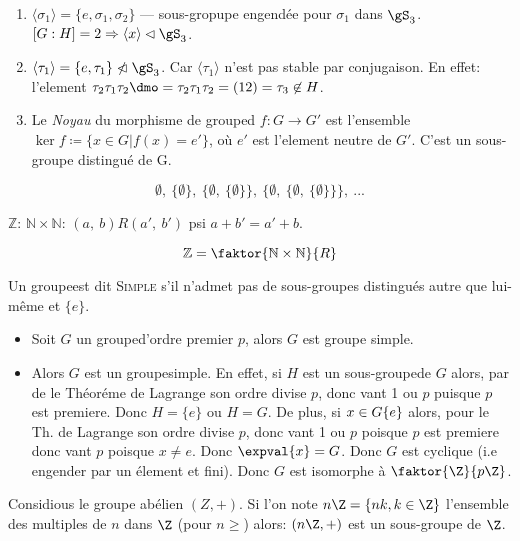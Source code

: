\begin{examplebox}
	\begin{enumerate}
		\item $\langle \sigma_1 \rangle=\{e,\sigma_1,\sigma_2\}$ --- sous-gropupe engendée pour $\sigma_1$ dans $\gS_3$. $[G:H]=2\Rightarrow \langle x\rangle\lhd\gS_3$.
		\item $\langle \tau_1\rangle=\{e,\tau_1\}\ntriangleleft\gS_3$. Car $\langle \tau_1 \rangle$ n'est pas stable par conjugaison. En effet: l'element $\tau_2\tau_1\tau_2\dmo =\tau_2\tau_1\tau_2=(12)=\tau_3\not\in H$.
		\item Le \emph{Noyau} du morphisme de grouped $f:G\rightarrow G'$ est l'ensemble $\ker f\coloneq\{x\in G | f(x)=e'\}$, où $e'$ est l'element neutre de $G'$. C'est un sous-groupe distingué de G.
	\end{enumerate}
\end{examplebox}

\ifcomment
$$\emptyset,\ \{\emptyset\},\ \{\emptyset,\ \{\emptyset\}\},\ \{\emptyset,\ \{\emptyset,\ \{\emptyset\}\}\},\ ...$$

$\mathbb{Z}$: $\mathbb{N}\times\mathbb{N}$:
$(a,\ b)R(a',\ b')$ psi $a+b'=a' + b$.

$$\mathbb{Z}=\faktor{\mathbb{N}\times\mathbb{N}}{R}$$
\fi


\begin{definition}
	Un groupeest dit \textsc{Simple} s'il n'admet pas de sous-groupes distingués autre que lui-même et $\{e\}$.
\end{definition}

\begin{examplebox}
	\begin{itemize}
		\item Soit $G$ un grouped'ordre premier $p$, alors $G$ est groupe simple.
		\item Alors $G$ est un groupesimple. En effet, si $H$ est un sous-groupede $G$ alors, par de le Théoréme de Lagrange son ordre divise $p$, donc vant 1 ou $p$ puisque $p$ est premiere. Donc $H=\{e\}$ ou $H=G$. De plus, si $x\in G\\ \{e\}$ alors, pour le Th. de Lagrange son ordre divise $p$, donc vant 1 ou $p$ poisque $p$ est premiere donc vant $p$ poisque $x\neq e$. Donc $\expval{x}=G$. Donc $G$ est cyclique (i.e engender par un élement et fini). Donc $G$ est isomorphe à $\faktor{\Z}{p\Z}$.
	\end{itemize}
\end{examplebox}

Considious le groupe abélien $(Z, +)$. Si l'on note $n\Z=\{nk, k\in\Z\}$ l'ensemble des multiples de $n$ dans $\Z$ (pour $n\geq$) alors: $(n\Z,+)$ est un sous-groupe de $\Z$.

